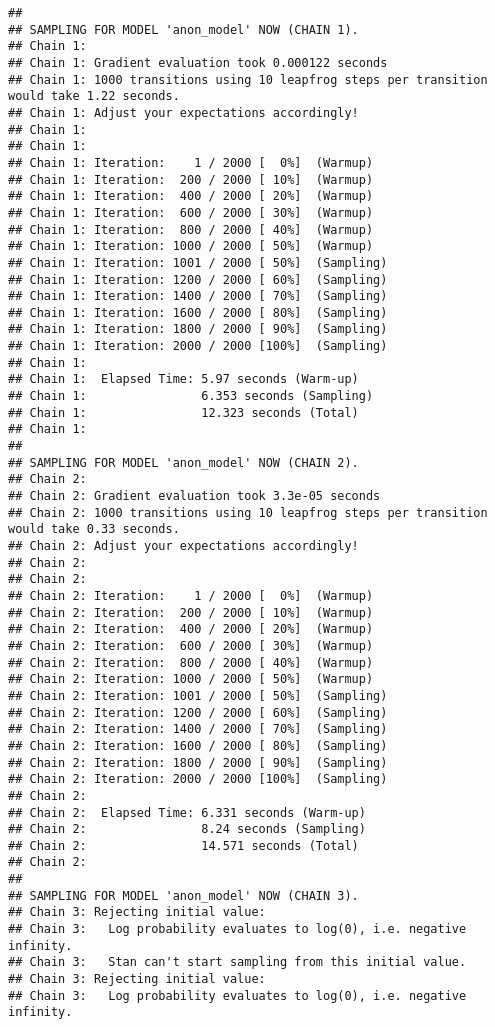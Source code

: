 \documentclass[
]{article}
\begin{document}
\begin{verbatim}
## 
## SAMPLING FOR MODEL 'anon_model' NOW (CHAIN 1).
## Chain 1: 
## Chain 1: Gradient evaluation took 0.000122 seconds
## Chain 1: 1000 transitions using 10 leapfrog steps per transition would take 1.22 seconds.
## Chain 1: Adjust your expectations accordingly!
## Chain 1: 
## Chain 1: 
## Chain 1: Iteration:    1 / 2000 [  0%]  (Warmup)
## Chain 1: Iteration:  200 / 2000 [ 10%]  (Warmup)
## Chain 1: Iteration:  400 / 2000 [ 20%]  (Warmup)
## Chain 1: Iteration:  600 / 2000 [ 30%]  (Warmup)
## Chain 1: Iteration:  800 / 2000 [ 40%]  (Warmup)
## Chain 1: Iteration: 1000 / 2000 [ 50%]  (Warmup)
## Chain 1: Iteration: 1001 / 2000 [ 50%]  (Sampling)
## Chain 1: Iteration: 1200 / 2000 [ 60%]  (Sampling)
## Chain 1: Iteration: 1400 / 2000 [ 70%]  (Sampling)
## Chain 1: Iteration: 1600 / 2000 [ 80%]  (Sampling)
## Chain 1: Iteration: 1800 / 2000 [ 90%]  (Sampling)
## Chain 1: Iteration: 2000 / 2000 [100%]  (Sampling)
## Chain 1: 
## Chain 1:  Elapsed Time: 5.97 seconds (Warm-up)
## Chain 1:                6.353 seconds (Sampling)
## Chain 1:                12.323 seconds (Total)
## Chain 1: 
## 
## SAMPLING FOR MODEL 'anon_model' NOW (CHAIN 2).
## Chain 2: 
## Chain 2: Gradient evaluation took 3.3e-05 seconds
## Chain 2: 1000 transitions using 10 leapfrog steps per transition would take 0.33 seconds.
## Chain 2: Adjust your expectations accordingly!
## Chain 2: 
## Chain 2: 
## Chain 2: Iteration:    1 / 2000 [  0%]  (Warmup)
## Chain 2: Iteration:  200 / 2000 [ 10%]  (Warmup)
## Chain 2: Iteration:  400 / 2000 [ 20%]  (Warmup)
## Chain 2: Iteration:  600 / 2000 [ 30%]  (Warmup)
## Chain 2: Iteration:  800 / 2000 [ 40%]  (Warmup)
## Chain 2: Iteration: 1000 / 2000 [ 50%]  (Warmup)
## Chain 2: Iteration: 1001 / 2000 [ 50%]  (Sampling)
## Chain 2: Iteration: 1200 / 2000 [ 60%]  (Sampling)
## Chain 2: Iteration: 1400 / 2000 [ 70%]  (Sampling)
## Chain 2: Iteration: 1600 / 2000 [ 80%]  (Sampling)
## Chain 2: Iteration: 1800 / 2000 [ 90%]  (Sampling)
## Chain 2: Iteration: 2000 / 2000 [100%]  (Sampling)
## Chain 2: 
## Chain 2:  Elapsed Time: 6.331 seconds (Warm-up)
## Chain 2:                8.24 seconds (Sampling)
## Chain 2:                14.571 seconds (Total)
## Chain 2: 
## 
## SAMPLING FOR MODEL 'anon_model' NOW (CHAIN 3).
## Chain 3: Rejecting initial value:
## Chain 3:   Log probability evaluates to log(0), i.e. negative infinity.
## Chain 3:   Stan can't start sampling from this initial value.
## Chain 3: Rejecting initial value:
## Chain 3:   Log probability evaluates to log(0), i.e. negative infinity.

\end{verbatim}
\end{document}
